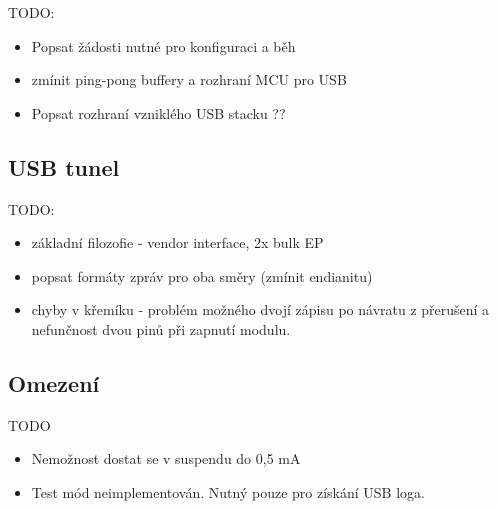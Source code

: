 TODO:
\begin{itemize}
\item Popsat žádosti nutné pro konfiguraci a běh
\item zmínit ping-pong buffery a rozhraní MCU pro USB
\item Popsat rozhraní vzniklého USB stacku ??
\end{itemize}

\subsection{USB \iic tunel}

TODO:
\begin{itemize}
\item základní filozofie - vendor interface, 2x bulk EP
\item popsat formáty zpráv pro oba směry (zmínit endianitu)
\item chyby v křemíku - problém možného dvojí zápisu po návratu z přerušení a nefunčnost dvou pinů při zapnutí \iic modulu.
\end{itemize}


\subsection{Omezení}

TODO
\begin{itemize}
\item Nemožnost dostat se v suspendu do 0,5 mA
\item Test mód neimplementován. Nutný pouze pro získání USB loga.
\end{itemize}
